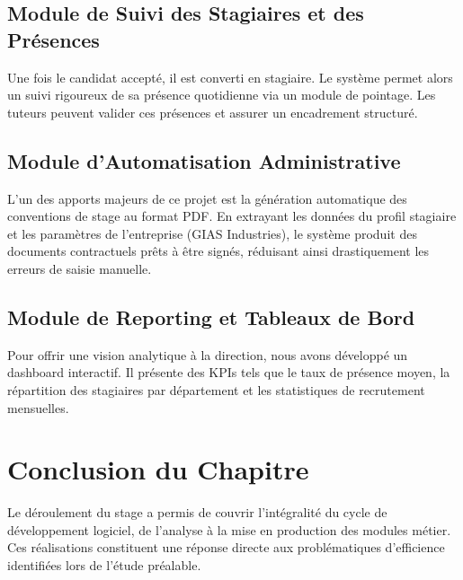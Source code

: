 \subsection{Module de Suivi des Stagiaires et des Présences}
Une fois le candidat accepté, il est converti en stagiaire. Le système permet alors un suivi rigoureux de sa présence quotidienne via un module de pointage. Les tuteurs peuvent valider ces présences et assurer un encadrement structuré.

\subsection{Module d'Automatisation Administrative}
L'un des apports majeurs de ce projet est la génération automatique des conventions de stage au format PDF. En extrayant les données du profil stagiaire et les paramètres de l'entreprise (GIAS Industries), le système produit des documents contractuels prêts à être signés, réduisant ainsi drastiquement les erreurs de saisie manuelle.

\subsection{Module de Reporting et Tableaux de Bord}
Pour offrir une vision analytique à la direction, nous avons développé un dashboard interactif. Il présente des KPIs tels que le taux de présence moyen, la répartition des stagiaires par département et les statistiques de recrutement mensuelles.

\section{Conclusion du Chapitre}
Le déroulement du stage a permis de couvrir l'intégralité du cycle de développement logiciel, de l'analyse à la mise en production des modules métier. Ces réalisations constituent une réponse directe aux problématiques d'efficience identifiées lors de l'étude préalable.